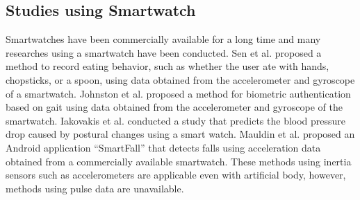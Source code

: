 \documentclass[sigchi,authordraft]{acmart}
\begin{document}
\subsection{Studies using Smartwatch}
Smartwatches have been commercially available for a long time and many researches using a smartwatch have been conducted.
Sen et al.\cite{eating_recognition} proposed a method to record eating behavior, such as whether the user ate with hands, chopsticks, or a spoon, using data obtained from the accelerometer and gyroscope of a smartwatch. 
Johnston et al.\cite{smartwatch_walk_authentication} proposed a method for biometric authentication based on gait using data obtained from the accelerometer and gyroscope of the smartwatch.
Iakovakis et al.\cite{oh_detection} conducted a study that predicts the blood pressure drop caused by postural changes using a smart watch. 
Mauldin et al.\cite{smartfall} proposed an Android application ``SmartFall'' that detects falls using acceleration data obtained from a commercially available smartwatch. 
These methods using inertia sensors such as accelerometers are applicable even with artificial body, however, methods using pulse data are unavailable.

\end{document}
